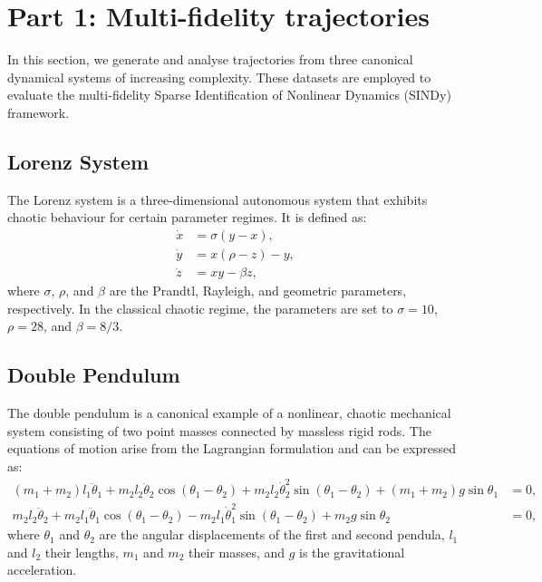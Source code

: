 \section{Part 1: Multi-fidelity trajectories}

In this section, we generate and analyse trajectories from three canonical dynamical systems of increasing complexity. These datasets are employed to evaluate the multi-fidelity Sparse Identification of Nonlinear Dynamics (SINDy) framework.

\subsection{Lorenz System}

The Lorenz system is a three-dimensional autonomous system that exhibits chaotic behaviour for certain parameter regimes. It is defined as:
\begin{equation}
\begin{aligned}
\dot{x} &= \sigma (y - x), \\
\dot{y} &= x(\rho - z) - y, \\
\dot{z} &= xy - \beta z,
\end{aligned}
\label{eq:lorenz}
\end{equation}
where $\sigma$, $\rho$, and $\beta$ are the Prandtl, Rayleigh, and geometric parameters, respectively. In the classical chaotic regime, the parameters are set to $\sigma = 10$, $\rho = 28$, and $\beta = 8/3$.

\subsection{Double Pendulum}

The double pendulum is a canonical example of a nonlinear, chaotic mechanical system consisting of two point masses connected by massless rigid rods. The equations of motion arise from the Lagrangian formulation and can be expressed as:
\begin{equation}
\begin{aligned}
(m_1 + m_2) l_1 \ddot{\theta}_1 + m_2 l_2 \ddot{\theta}_2 \cos(\theta_1 - \theta_2)
+ m_2 l_2 \dot{\theta}_2^2 \sin(\theta_1 - \theta_2)
+ (m_1 + m_2) g \sin \theta_1 &= 0, \\
m_2 l_2 \ddot{\theta}_2 + m_2 l_1 \ddot{\theta}_1 \cos(\theta_1 - \theta_2)
- m_2 l_1 \dot{\theta}_1^2 \sin(\theta_1 - \theta_2)
+ m_2 g \sin \theta_2 &= 0,
\end{aligned}
\label{eq:double_pendulum}
\end{equation}
where $\theta_1$ and $\theta_2$ are the angular displacements of the first and second pendula, $l_1$ and $l_2$ their lengths, $m_1$ and $m_2$ their masses, and $g$ is the gravitational acceleration.

